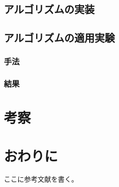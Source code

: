 \documentclass[xelatex,ja=standard,fontsize=10.5pt]{bxjsreport}
\begin{document}
\section{アルゴリズムの実装}

\section{アルゴリズムの適用実験}

\subsection{手法}

\subsection{結果}

%
\chapter{考察}

%
\chapter{おわりに}

\backmatter

\begin{thebibliography}{}
     ここに参考文献を書く。
\end{thebibliography}
\clearpage
\end{document}
